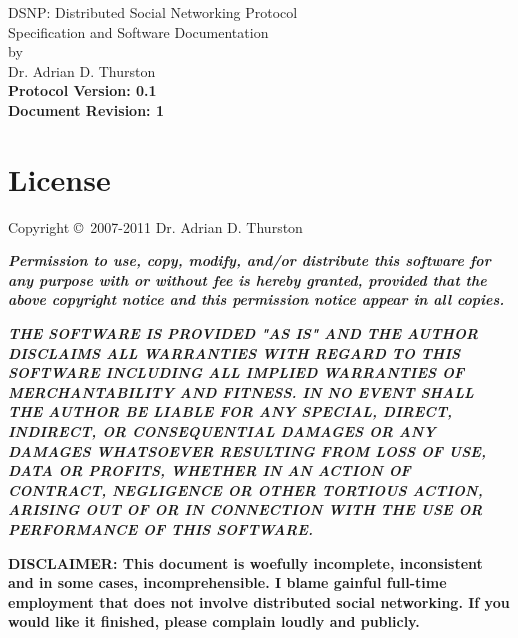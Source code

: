 \documentclass[letterpaper,11pt,oneside]{article}
\begin{document}
%
%
\thispagestyle{empty}
\begin{center}
{\huge DSNP: Distributed Social Networking Protocol}\\
\vspace*{12pt}
{\Large Specification and Software Documentation}\\
\vspace{12pt}
by\\
\vspace{12pt}
{\large Dr. Adrian D. Thurston}\\
\vspace{22pt}
{\noindent\bf\large Protocol Version: 0.1}\\
\vspace{12pt}
{\noindent\bf\large Document Revision: 1}
\end{center}


\vspace{1.5in}

\section*{License}

Copyright \copyright\ 2007-2011 Dr. Adrian D. Thurston

\vspace{5pt}

{\bf\it\noindent Permission to use, copy, modify, and/or distribute this
software for any purpose with or without fee is hereby granted, provided that
the above copyright notice and this permission notice appear in all copies.}

\vspace{5pt}

{\bf\it\noindent
THE SOFTWARE IS PROVIDED "AS IS" AND THE AUTHOR DISCLAIMS ALL WARRANTIES
WITH REGARD TO THIS SOFTWARE INCLUDING ALL IMPLIED WARRANTIES OF
MERCHANTABILITY AND FITNESS. IN NO EVENT SHALL THE AUTHOR BE LIABLE FOR
ANY SPECIAL, DIRECT, INDIRECT, OR CONSEQUENTIAL DAMAGES OR ANY DAMAGES
WHATSOEVER RESULTING FROM LOSS OF USE, DATA OR PROFITS, WHETHER IN AN
ACTION OF CONTRACT, NEGLIGENCE OR OTHER TORTIOUS ACTION, ARISING OUT OF
OR IN CONNECTION WITH THE USE OR PERFORMANCE OF THIS SOFTWARE.}

\vspace{1.5in}

{\noindent\bf\large DISCLAIMER: This document is woefully incomplete,
inconsistent and in some cases, incomprehensible. I blame gainful full-time
employment that does not involve distributed social networking. If you would
like it finished, please complain loudly and publicly.}
\end{document}
